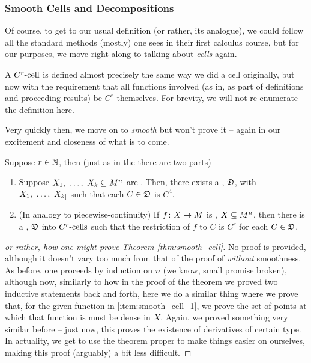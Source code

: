 \subsubsection{Smooth Cells and Decompositions}

Of course, to get to our usual definition (or rather, its analogue), we could follow all the standard methods (mostly) one sees in their first calculus course, but for our purposes, we move right along to talking about \emph{cells} again. 

\begin{definition}[$C^r$-cells]
A $\Crcell[r]$ is defined almost precisely the same way we did a cell originally, but now with the requirement that all functions involved (as in, as part of definitions and proceeding results) be $C^r$ themselves. For brevity, we will not re-enumerate the definition here.
\end{definition}

Very quickly then, we move on to \emph{smooth} \cd but won't prove it -- again in our excitement and closeness of what is to come.

\begin{theorem}
  Suppose $r \in \N$, then (just as in the \CDt there are two parts)
    \begin{enumerate}
      \item \label{item:smooth_cell_1} Suppose $\vonevm{X}{k} \subseteq M^n$ are . Then, there exists a \cd, $\fancyD$, \cmptble with $\vonevm{X}{k]}$ such that each $C \in \fancyD$ is $C^4$.

      \item \label{item:smooth_cell_2} (In analogy to piecewise-continuity) If $\funcdom{f}{X}{M}$ is , $\XMn[X]{n}$, then there is a \cd, $\fancyD$ into $\Crcells$ such that the restriction of $f$ to $C$ is $C^r$ for each $C \in \fancyD$.
    \end{enumerate}

  \label{thm:smooth_cell}
\end{theorem}

\begin{proof}[or rather, how one might prove Theorem \ref{thm:smooth_cell}]
  No proof is provided, although it doesn't vary too much from that of the proof of \CD \emph{without} smoothness. As before, one proceeds by induction on $n$ (we know, small promise broken), although now, similarly to how in the proof of the \CD theorem we proved two inductive statements back and forth, here we do a similar thing where we prove that, for the given function in \ref {item:smooth_cell_1}, we prove the set of points at which that function is \cont must be dense in $X$. Again, we proved something very similar before -- just now, this proves the existence of derivatives of certain type. In actuality, we get to use the \CD theorem proper to make things easier on ourselves, making this proof (arguably) a bit less difficult.
\end{proof}

